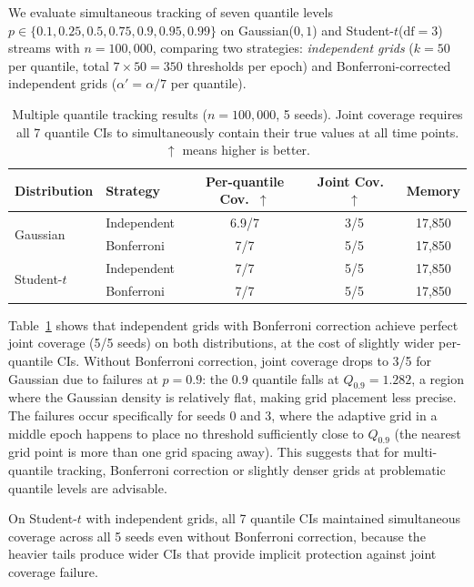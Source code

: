 \documentclass{article}
\begin{document}
We evaluate simultaneous tracking of seven quantile levels $p \in \{0.1, 0.25, 0.5, 0.75, 0.9, 0.95, 0.99\}$ on Gaussian($0,1$) and Student-$t$($\text{df}\!=\!3$) streams with $n = 100{,}000$, comparing two strategies: \emph{independent grids} ($k = 50$ per quantile, total $7 \times 50 = 350$ thresholds per epoch) and Bonferroni-corrected independent grids ($\alpha' = \alpha/7$ per quantile).

\begin{table}[t]
\caption{Multiple quantile tracking results ($n = 100{,}000$, 5 seeds). Joint coverage requires all 7 quantile CIs to simultaneously contain their true values at all time points. $\uparrow$ means higher is better.}
\label{tab:multiquantile}
\centering
\begin{tabular}{llccc}
\toprule
Distribution & Strategy & Per-quantile Cov.\ $\uparrow$ & Joint Cov.\ $\uparrow$ & Memory \\
\midrule
\multirow{2}{*}{Gaussian} & Independent & 6.9/7 & 3/5 & 17{,}850 \\
                          & Bonferroni  & 7/7   & 5/5 & 17{,}850 \\
\midrule
\multirow{2}{*}{Student-$t$} & Independent & 7/7   & 5/5 & 17{,}850 \\
                             & Bonferroni  & 7/7   & 5/5 & 17{,}850 \\
\bottomrule
\end{tabular}
\end{table}

Table~\ref{tab:multiquantile} shows that independent grids with Bonferroni correction achieve perfect joint coverage (5/5 seeds) on both distributions, at the cost of slightly wider per-quantile CIs. Without Bonferroni correction, joint coverage drops to 3/5 for Gaussian due to failures at $p = 0.9$: the 0.9 quantile falls at $Q_{0.9} = 1.282$, a region where the Gaussian density is relatively flat, making grid placement less precise. The failures occur specifically for seeds 0 and 3, where the adaptive grid in a middle epoch happens to place no threshold sufficiently close to $Q_{0.9}$ (the nearest grid point is more than one grid spacing away). This suggests that for multi-quantile tracking, Bonferroni correction or slightly denser grids at problematic quantile levels are advisable.

On Student-$t$ with independent grids, all 7 quantile CIs maintained simultaneous coverage across all 5 seeds even without Bonferroni correction, because the heavier tails produce wider CIs that provide implicit protection against joint coverage failure.
\end{document}
